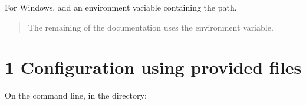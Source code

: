 \documentclass[letterpaper,10pt,english]{sphinxmanual}
\begin{document}
\sphinxAtStartPar
For Windows, add an environment variable  containing the path.
\begin{quote}

\sphinxAtStartPar
The remaining of the documentation uses the  environment variable.
\end{quote}


\section{1\sphinxhyphen{} Configuration using provided  files}
\label{\detokenize{Installation:configuration-using-provided-cmakelists-txt-files}}\label{\detokenize{Installation:cmake-configuration}}
\sphinxAtStartPar
On the command line, in the  directory:

\begin{sphinxVerbatim}[commandchars=\\\{\}]
    
\end{sphinxVerbatim}
\end{document}
